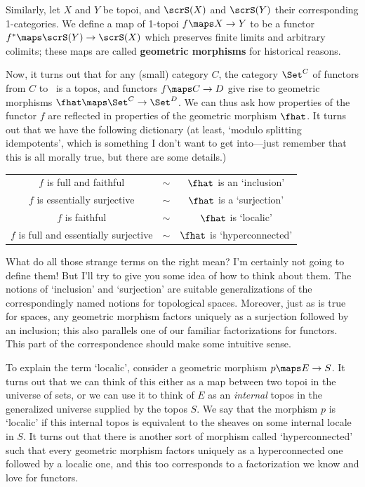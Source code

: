 \documentclass{amsart}
\begin{document}
Similarly, let $X$ and $Y$ be topoi, and $\scrS(X)$ and $\scrS(Y)$
their corresponding 1-categories.  We define a map of 1-topoi $f\maps
X\to Y$ to be a functor $f^*\maps \scrS(Y)\to \scrS(X)$ which
preserves finite limits and arbitrary colimits; these maps are called
\textbf{geometric morphisms} for historical reasons.

Now, it turns out that for any (small) category $C$, the category
$\Set^C$ of functors from $C$ to \Set\ is a topos, and functors
$f\maps C\to D$ give rise to geometric morphisms $\fhat\maps \Set^C\to
\Set^D$.  We can thus ask how properties of the functor $f$ are
reflected in properties of the geometric morphism $\fhat$.  It turns
out that we have the following dictionary (at least, `modulo splitting
idempotents', which is something I don't want to get into---just
remember that this is all morally true, but there are some details.)

\begin{center}
  \begin{tabular}{ccc}
    $f$ is full and faithful & $\sim$ & $\fhat$ is an `inclusion'\\
    $f$ is essentially surjective & $\sim$ & $\fhat$ is a `surjection'\\
    $f$ is faithful & $\sim$ & $\fhat$ is `localic'\\
    $f$ is full and essentially surjective & $\sim$ & $\fhat$ is `hyperconnected'
  \end{tabular}
\end{center}

What do all those strange terms on the right mean?  I'm certainly not
going to define them!  But I'll try to give you some idea of how to
think about them.  The notions of `inclusion' and `surjection' are
suitable generalizations of the correspondingly named notions for
topological spaces.  Moreover, just as is true for spaces, any
geometric morphism factors uniquely as a surjection followed by an
inclusion; this also parallels one of our familiar factorizations for
functors.  This part of the correspondence should make some intuitive
sense.

To explain the term `localic', consider a geometric morphism $p\maps
E\to S$.  It turns out that we can think of this either as a map
between two topoi in the universe of sets, or we can use it to think
of $E$ as an \emph{internal} topos in the generalized universe
supplied by the topos $S$.  We say that the morphism $p$ is `localic'
if this internal topos is equivalent to the sheaves on some internal
locale in $S$.  It turns out that there is another sort of morphism
called `hyperconnected' such that every geometric morphism factors
uniquely as a hyperconnected one followed by a localic one, and this
too corresponds to a factorization we know and love for functors.
\end{document}
